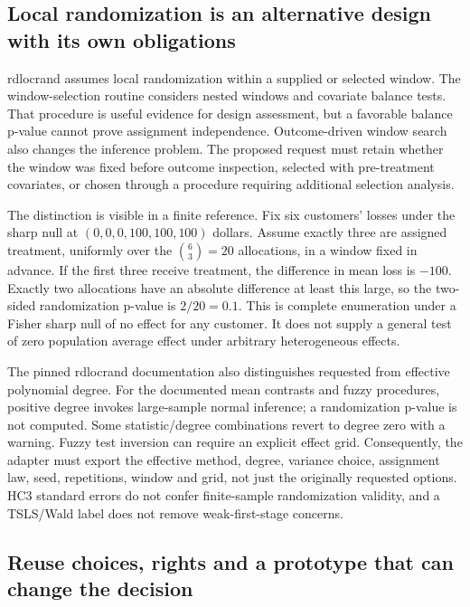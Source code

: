 \subsection{Local randomization is an alternative design with its own obligations}
\label{exec22:riv-randomization}

rdlocrand assumes local randomization within a supplied or selected window. The
window-selection routine considers nested windows and covariate balance tests.
That procedure is useful evidence for design assessment, but a favorable balance
p-value cannot prove assignment independence. Outcome-driven window search also
changes the inference problem. The proposed request must retain whether the window
was fixed before outcome inspection, selected with pre-treatment covariates, or
chosen through a procedure requiring additional selection analysis.
\citep{exec22_riv_rdlocrand}

The distinction is visible in a finite reference. Fix six customers' losses under
the sharp null at $(0,0,0,100,100,100)$ dollars. Assume exactly three are assigned
treatment, uniformly over the $\binom63=20$ allocations, in a window fixed in
advance. If the first three receive treatment, the difference in mean loss is
$-100$. Exactly two allocations have an absolute difference at least this large,
so the two-sided randomization p-value is $2/20=0.1$. This is complete enumeration
under a Fisher sharp null of no effect for any customer. It does not supply a
general test of zero population average effect under arbitrary heterogeneous
effects.\citep{exec22_riv_reference}

The pinned rdlocrand documentation also distinguishes requested from effective
polynomial degree. For the documented mean contrasts and fuzzy procedures,
positive degree invokes large-sample normal inference; a randomization p-value
is not computed. Some statistic/degree combinations revert to degree zero with
a warning. Fuzzy test inversion can require an explicit effect grid. Consequently,
the adapter must export the effective method, degree, variance choice, assignment
law, seed, repetitions, window and grid, not just the originally requested
options. HC3 standard errors do not confer finite-sample randomization validity,
and a TSLS/Wald label does not remove weak-first-stage concerns.
\citep{exec22_riv_rdlocrand}

\subsection{Reuse choices, rights and a prototype that can change the decision}
\label{exec22:riv-reuse}

